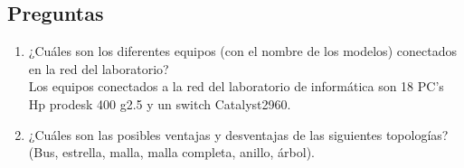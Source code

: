 \documentclass{article}
\begin{document}
\subsection{Preguntas \vspace{0.3cm}}
\begin{enumerate}
    \item ¿Cuáles son los diferentes equipos (con el nombre de los modelos) conectados en la red del laboratorio?\\
    \newline Los equipos conectados a la red del laboratorio de informática son 18 PC's Hp prodesk 400 g2.5 y un switch Catalyst2960.
    
    \item ¿Cuáles son las posibles ventajas y desventajas de las siguientes topologías? (Bus, estrella, malla, malla completa, anillo, árbol).


\end{enumerate}
\end{document}
